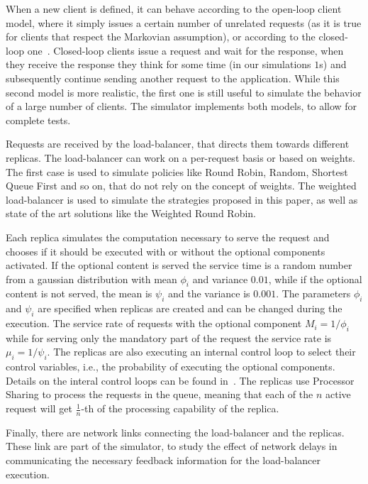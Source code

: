 When a new client is defined, it can behave according to the open-loop
client model, where it simply issues a certain number of unrelated
requests (as it is true for clients that respect the Markovian
assumption), or according to the closed-loop
one~\cite{openvsclosed}. Closed-loop clients issue a request and wait
for the response, when they receive the response they think for some
time (in our simulations $1$s) and subsequently continue sending
another request to the application. While this second model is more
realistic, the first one is still useful to simulate the behavior of a
large number of clients. The simulator implements both models, to
allow for complete tests.

Requests are received by the load-balancer, that directs them towards
different replicas. The load-balancer can work on a per-request basis
or based on weights. The first case is used to simulate policies like
Round Robin, Random, Shortest Queue First and so on, that do not rely
on the concept of weights. The weighted load-balancer is used to
simulate the strategies proposed in this paper, as well as state of
the art solutions like the Weighted Round Robin.

Each replica simulates the computation necessary to serve the request
and chooses if it should be executed with or without the optional
components activated. If the optional content is served the service
time is a random number from a gaussian distribution with mean
$\phi_i$ and variance $0.01$, while if the optional content is not
served, the mean is $\psi_i$ and the variance is $0.001$. The
parameters $\phi_i$ and $\psi_i$ are specified when replicas are
created and can be changed during the execution. The service rate of
requests with the optional component $M_i = 1/\phi_i$ while for
serving only the mandatory part of the request the service rate is
$\mu_i = 1/\psi_i$. The replicas are also executing an internal
control loop to select their control variables, i.e., the probability
of executing the optional components. Details on the interal control
loops can be found in~\cite{cloudish-tr}. The replicas use Processor
Sharing to process the requests in the queue, meaning that each of the
$n$ active request will get $\frac{1}{n}$-th of the processing
capability of the replica.

Finally, there are network links connecting the load-balancer and the
replicas. These link are part of the simulator, to study the effect of
network delays in communicating the necessary feedback information for
the load-balancer execution.


